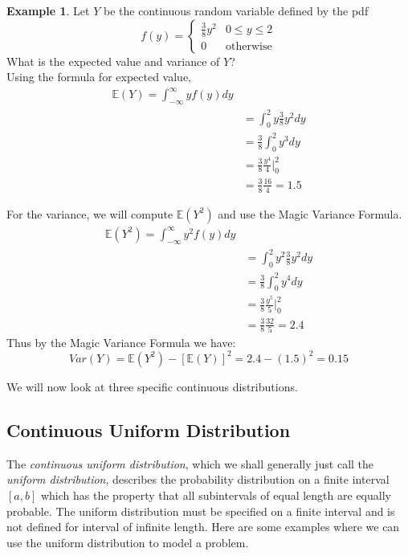 \documentclass[12pt]{article}
\theoremstyle{definition}
\newtheorem*{example}{Example}
\theoremstyle{remark}
\def\E{{\mathbb E}}
\begin{document}
\begin{example}Let $Y$ be the continuous random variable defined by the pdf
\[
f(y) = \begin{cases}
\frac{3}{8}y^2 & 0 \leq y\leq 2\\
0 & \text{otherwise}
\end{cases}
\]
What is the expected value and variance of $Y$?\\

Using the formula for expected value,
\begin{align*}
\E(Y) = \int_{-\infty}^\infty y f(y) dy \\
&= \int_0^2 y\frac{3}{8}y^2 dy \\
&= \frac{3}{8}\int_0^2 y^3 dy\\
&= \frac{3}{8}\frac{y^4}{4}\Bigr|_0^2 \\
&= \frac{3}{8}\frac{16}{4} = 1.5
\end{align*}

For the variance, we will compute $\E(Y^2)$ and use the Magic Variance Formula.
\begin{align*}
\E(Y^2) = \int_{-\infty}^\infty y^2 f(y) dy \\
&= \int_0^2 y^2\frac{3}{8}y^2 dy \\
&= \frac{3}{8}\int_0^2 y^4 dy\\
&= \frac{3}{8}\frac{y^5}{5}\Bigr|_0^2 \\
&= \frac{3}{8}\frac{32}{5} = 2.4
\end{align*}
Thus by the Magic Variance Formula we have:
\[
Var(Y) = \E(Y^2) - [\E(Y)]^2 = 2.4 - (1.5)^2 = 0.15
\]
\end{example}

We will now look at three specific continuous distributions.

\subsection{Continuous Uniform Distribution}

The \emph{continuous uniform distribution}, which we shall generally just call the \emph{uniform distribution}, describes the probability distribution on a finite interval $[a, b]$ which has the property that all subintervals of equal length are equally probable. The uniform distribution must be specified on a finite interval and is not defined for interval of infinite length. Here are some examples where we can use the uniform distribution to model a problem.
\end{document}
